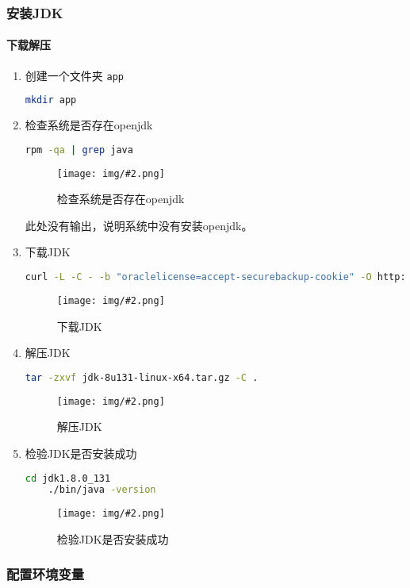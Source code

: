\documentclass{article}
\newenvironment{enum}{
    \begin{enumerate}[label=(\arabic*), noitemsep]
}{
    \end{enumerate}
}
\newcommand{\img}[3][0.9]{%
    \begin{figure}[H]
        \centering
        \texttt{[image: img/\#2.png]}
        \caption{#3}
    \end{figure}
}
\newcommand{\subsubsubsection}[1]{\paragraph{#1}\mbox{}}
\begin{document}
\subsubsection{安装JDK}

\subsubsubsection{下载解压}

\begin{enum}
    \item 创建一个文件夹 \texttt{app}
    
    \begin{lstlisting}[language=bash]
    mkdir app
    \end{lstlisting}

    \item 检查系统是否存在openjdk
    
    \begin{lstlisting}[language=bash]
    rpm -qa | grep java
    \end{lstlisting}

    \img{2.1.1.1}{检查系统是否存在openjdk}

    此处没有输出，说明系统中没有安装openjdk。

    \item 下载JDK
    
    \begin{lstlisting}[language=bash]
    curl -L -C - -b "oraclelicense=accept-securebackup-cookie" -O http://download.oracle.com/otn-pub/java/jdk/8u131-b11/d54c1d3a095b4ff2b6607d096fa80163/jdk-8u131-linux-x64.tar.gz
    \end{lstlisting}

    \img{2.1.1.2}{下载JDK}

    \item 解压JDK
    
    \begin{lstlisting}[language=bash]
    tar -zxvf jdk-8u131-linux-x64.tar.gz -C .
    \end{lstlisting}

    \img{2.1.1.3}{解压JDK}

    \item 检验JDK是否安装成功
    
    \begin{lstlisting}[language=bash]
    cd jdk1.8.0_131
    ./bin/java -version
    \end{lstlisting}

    \img{2.1.1.4}{检验JDK是否安装成功}
\end{enum}

\subsubsection{配置环境变量}
\end{document}
